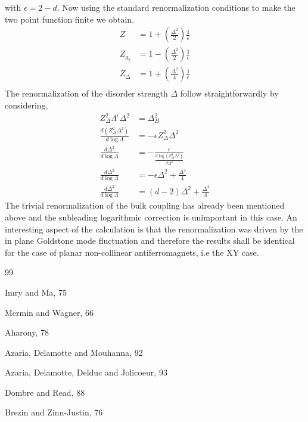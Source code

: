\documentclass[notitlepage,onecolumn,showpacs,11pt]{revtex4-1}
\begin{document}
with $\epsilon=2-d$. Now using the standard renormalization conditions
to make the two point function finite we obtain.
\begin{equation}
    \begin{aligned}
        Z &= 1 + \left(\frac{\Delta^2}{2}\right)\frac{1}{\epsilon}\\
        Z_{g_2} &= 1 - \left(\frac{\Delta^2}{2}\right)\frac{1}{\epsilon}\\
        Z_\Delta &= 1 + \left(\frac{\Delta^2}{4}\right)\frac{1}{\epsilon}\\
    \end{aligned}
\end{equation}
The renormalization of the disorder strength $\Delta$ follow 
straightforwardly by considering,
\begin{equation}
    \begin{aligned}
        Z^2_\Delta\Lambda^\epsilon\Delta^2 &= \Delta_B^2 \\
        \frac{d(Z_\Delta^2\Delta^2)}{d\log\Lambda}
        &=-\epsilon Z^2_\Delta\Delta^2\\
        \frac{d\Delta^2}{d\log\Lambda}
        &=-\frac{\epsilon}{\frac{d\log(Z_\Delta^2\Delta^2)}{d\Delta^2}}\\
        \frac{d\Delta^2}{d\log\Lambda}
        &=-\epsilon\Delta^2 + \frac{\Delta^4}{4}\\
        \frac{d\Delta^2}{d\log\Lambda}
        &=(d-2)\Delta^2 + \frac{\Delta^4}{4}   
    \end{aligned}
\end{equation}
The trivial renormalization of the bulk coupling has already been
mentioned above and the subleading logarithmic correction is unimportant
in this case. An interesting aspect of the calculation is that the 
renormalization was driven by the in plane Goldstone mode fluctuation 
and therefore the results shall be identical for the case of planar 
non-collinear antiferromagnets, i.e the XY case.

\begin{thebibliography}{99}

        Imry and Ma, 75

        Mermin and Wagner, 66

        Aharony, 78

        Azaria, Delamotte and Mouhanna, 92

        Azaria, Delamotte, Delduc and Jolicoeur, 93

        Dombre and Read, 88

        Brezin and Zinn-Justin, 76

\end{thebibliography}
\end{document}
